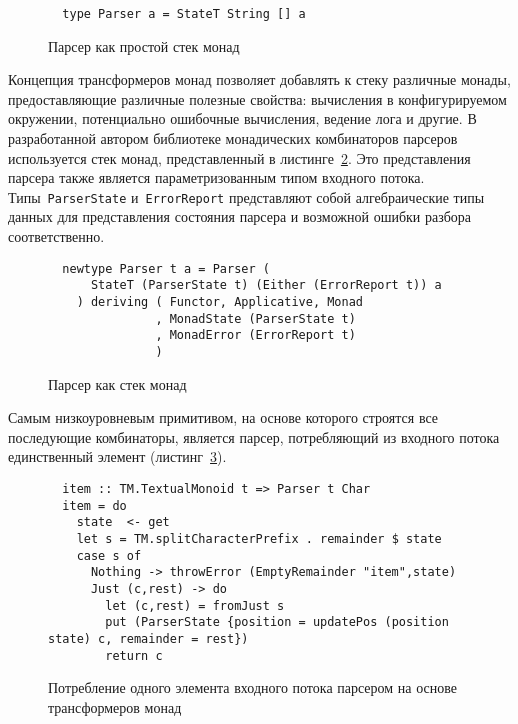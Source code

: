   \begin{figure}[h]
  \begin{lstlisting}
  type Parser a = StateT String [] a
  \end{lstlisting}
  \caption{Парсер как простой стек монад}
  \label{listing:monadStackParserType}
  \end{figure}

  Концепция трансформеров монад позволяет добавлять к стеку различные монады, 
  предоставляющие различные полезные свойства: вычисления в конфигурируемом окружении, 
  потенциально ошибочные вычисления, ведение лога и другие. В разработанной автором 
  библиотеке монадических комбинаторов парсеров~\cite{mdParse} используется 
  стек монад, представленный в листинге~\ref{listing:hugeMonadStackParserType}. Это 
  представления парсера также является параметризованным типом входного потока.
  Типы~\lstinline{ParserState} и~\lstinline{ErrorReport} представляют собой 
  алгебраические типы данных для представления состояния парсера и возможной 
  ошибки разбора соответственно.

  \begin{figure}[h]
  \begin{lstlisting}
  newtype Parser t a = Parser (  
      StateT (ParserState t) (Either (ErrorReport t)) a
    ) deriving ( Functor, Applicative, Monad
               , MonadState (ParserState t)
               , MonadError (ErrorReport t)
               )
  \end{lstlisting}
  \caption{Парсер как стек монад}
  \label{listing:hugeMonadStackParserType}
  \end{figure}

  Самым низкоуровневым примитивом, на основе которого строятся все последующие 
  комбинаторы, является парсер, потребляющий из входного потока единственный элемент
  (листинг~\ref{listing:mtlParsersItem}).

  \begin{figure}[h]
  \begin{lstlisting}
  item :: TM.TextualMonoid t => Parser t Char
  item = do
    state  <- get
    let s = TM.splitCharacterPrefix . remainder $ state
    case s of 
      Nothing -> throwError (EmptyRemainder "item",state)
      Just (c,rest) -> do  
        let (c,rest) = fromJust s
        put (ParserState {position = updatePos (position state) c, remainder = rest})
        return c  
  \end{lstlisting}
  \caption{Потребление одного элемента входного потока парсером на основе трансформеров 
  монад}
  \label{listing:mtlParsersItem}
  \end{figure} 

